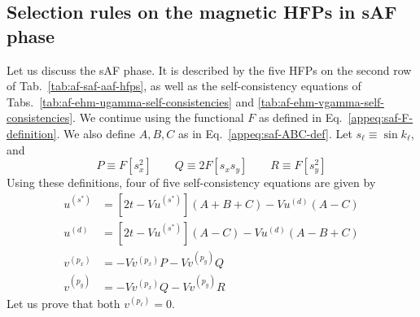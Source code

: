 \subsection{Selection rules on the magnetic HFPs in sAF phase}\label{appsubsec:af-HFPs=0-aAF}

Let us discuss the sAF phase. It is described by the five HFPs on the second row of Tab.~\ref{tab:af-saf-aaf-hfps}, as well as the self-consistency equations of Tabs.~\ref{tab:af-ehm-ugamma-self-consistencies} and \ref{tab:af-ehm-vgamma-self-consistencies}. We continue using the functional $F$ as defined in Eq.~\eqref{appeq:saf-F-definition}. We also define $A,B,C$ as in Eq.~\eqref{appeq:saf-ABC-def}. Let $s_\ell \equiv \sin k_\ell$, and
\begin{equation}\label{appeq:saf-PQR-def}
	P \equiv F\left[s_x^2\right]
	\qquad
	Q \equiv 2F\left[s_x s_y\right]
	\qquad
	R \equiv F\left[s_y^2\right]
\end{equation}
Using these definitions, four of five self-consistency equations are given by
\begin{align}
	u^{(s^*)} &=
	\left[2t - Vu^{(s^*)}\right] (A+B+C) -  Vu^{(d)} (A-C) \label{appeq:aaf-uS-sc-ABC} \\
	u^{(d)} &=
	\left[2t - Vu^{(s^*)}\right] (A-C) -  Vu^{(d)} (A-B+C) \label{appeq:aaf-ud-sc-ABC} \\
	v^{(p_x)} &=
	- Vv^{(p_x)} P - Vv^{(p_y)} Q\label{appeq:aaf-vx-sc-PQR} \\
	v^{(p_y)} &=
	- Vv^{(p_x)} Q - Vv^{(p_y)} R \label{appeq:aaf-vy-sc-PQR}
\end{align}
Let us prove that both $v^{(p_\ell)}=0$.
